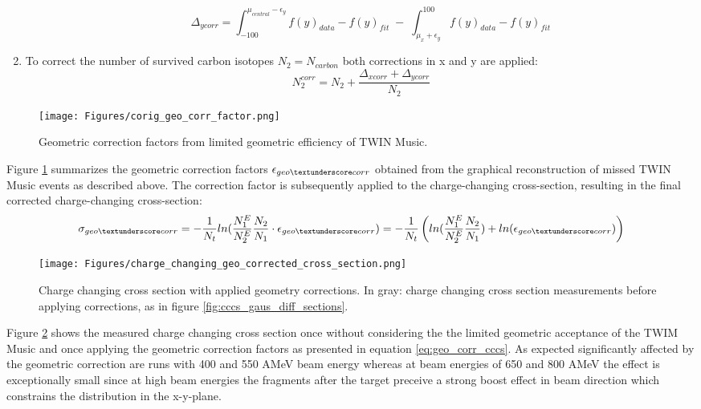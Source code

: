 \begin{enumerate}
\begin{enumerate}
\begin{equation}
\Delta_{ycorr} = \int_{-100}^{\mu_{central} - \epsilon_y} f(y)_{data} - f(y)_{fit} \; - \; \int_{\mu_x + \epsilon_y}^{100} f(y)_{data} - f(y)_{fit} 
\end{equation}
\end{enumerate}
\item To correct the number of survived carbon isotopes $N_2 = N_{carbon}$ both corrections in x and y are applied:
\begin{equation}
N_2^{corr} = N_2 +\frac{\Delta_{xcorr}+\Delta_{ycorr}}{N_2}
\end{equation}
\end{enumerate}
\begin{figure}[htpb]
    \centering
    \texttt{[image: Figures/corig\_geo\_corr\_factor.png]}
    \caption{
    Geometric correction factors from limited geometric efficiency of TWIN Music. 
     }
    \label{fig:geo_corr_twim}
\end{figure}
Figure \ref{fig:geo_corr_twim} summarizes the geometric correction factors $\epsilon_{geo\textunderscore corr}$ obtained from the graphical reconstruction of missed TWIN Music events as described above. The correction factor is subsequently applied to the charge-changing cross-section, resulting in the final corrected charge-changing cross-section:
\begin{equation}
\sigma_{geo\textunderscore corr} = -\frac{1}{N_t} ln(\frac{N_{1}^E}{N_{2}^E}\frac{N_2}{N_1}\cdot \epsilon_{geo\textunderscore corr}) = -\frac{1}{N_t} \left( ln(\frac{N_{1}^E}{N_{2}^E}\frac{N_2}{N_1}) + ln(\epsilon_{geo\textunderscore corr})\right)
\label{eq:geo_corr_cccs}
\end{equation}
\begin{figure}[htpb]
    \centering
    \texttt{[image: Figures/charge\_changing\_geo\_corrected\_cross\_section.png]}
    \caption{
    Charge changing cross section with applied geometry corrections. In gray: charge changing cross section measurements before applying corrections, as in figure \ref{fig:cccs_gaus_diff_sections}. 
     }
    \label{fig:geo_corr_cross_sec}
\end{figure}
Figure \ref{fig:geo_corr_cross_sec} shows the measured charge changing cross section once without considering the the limited geometric acceptance of the TWIM Music and once applying the geometric correction factors as presented in equation \ref{eq:geo_corr_cccs}. As expected significantly affected by the  geometric correction are runs with 400 and 550 AMeV beam energy whereas at beam energies of 650 and 800 AMeV the effect is exceptionally small since at high beam energies  the fragments after the target preceive a strong boost effect in beam direction which constrains the distribution in the x-y-plane.


